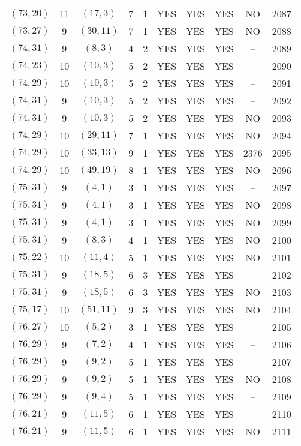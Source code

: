 \begin{longtable}{|c|c|c|c|c|c|c|c|c|c|}
$(73, 20)$ & 11 & $(17, 3)$ & 7 & 1 & YES & YES & YES & NO & 2087\\
$(73, 27)$ & 9 & $(30, 11)$ & 7 & 1 & YES & YES & YES & NO & 2088\\
$(74, 31)$ & 9 & $(8, 3)$ & 4 & 2 & YES & YES & YES & -- & 2089\\
$(74, 23)$ & 10 & $(10, 3)$ & 5 & 2 & YES & YES & YES & -- & 2090\\
$(74, 29)$ & 10 & $(10, 3)$ & 5 & 2 & YES & YES & YES & -- & 2091\\
$(74, 31)$ & 9 & $(10, 3)$ & 5 & 2 & YES & YES & YES & -- & 2092\\
$(74, 31)$ & 9 & $(10, 3)$ & 5 & 2 & YES & YES & YES & NO & 2093\\
$(74, 29)$ & 10 & $(29, 11)$ & 7 & 1 & YES & YES & YES & NO & 2094\\
$(74, 29)$ & 10 & $(33, 13)$ & 9 & 1 & YES & YES & YES & 2376 & 2095\\
$(74, 29)$ & 10 & $(49, 19)$ & 8 & 1 & YES & YES & YES & NO & 2096\\
$(75, 31)$ & 9 & $(4, 1)$ & 3 & 1 & YES & YES & YES & -- & 2097\\
$(75, 31)$ & 9 & $(4, 1)$ & 3 & 1 & YES & YES & YES & NO & 2098\\
$(75, 31)$ & 9 & $(4, 1)$ & 3 & 1 & YES & YES & YES & NO & 2099\\
$(75, 31)$ & 9 & $(8, 3)$ & 4 & 1 & YES & YES & YES & NO & 2100\\
$(75, 22)$ & 10 & $(11, 4)$ & 5 & 1 & YES & YES & YES & NO & 2101\\
$(75, 31)$ & 9 & $(18, 5)$ & 6 & 3 & YES & YES & YES & -- & 2102\\
$(75, 31)$ & 9 & $(18, 5)$ & 6 & 3 & YES & YES & YES & NO & 2103\\
$(75, 17)$ & 10 & $(51, 11)$ & 9 & 3 & YES & YES & YES & NO & 2104\\
$(76, 27)$ & 10 & $(5, 2)$ & 3 & 1 & YES & YES & YES & -- & 2105\\
$(76, 29)$ & 9 & $(7, 2)$ & 4 & 1 & YES & YES & YES & -- & 2106\\
$(76, 29)$ & 9 & $(9, 2)$ & 5 & 1 & YES & YES & YES & -- & 2107\\
$(76, 29)$ & 9 & $(9, 2)$ & 5 & 1 & YES & YES & YES & NO & 2108\\
$(76, 29)$ & 9 & $(9, 4)$ & 5 & 1 & YES & YES & YES & -- & 2109\\
$(76, 21)$ & 9 & $(11, 5)$ & 6 & 1 & YES & YES & YES & -- & 2110\\
$(76, 21)$ & 9 & $(11, 5)$ & 6 & 1 & YES & YES & YES & NO & 2111\\

\end{longtable}
